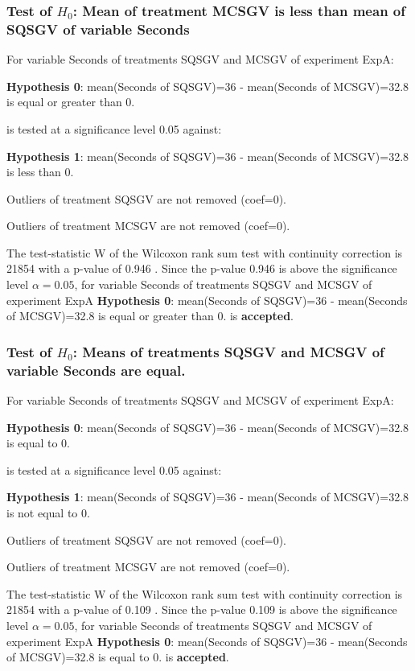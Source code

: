 \documentclass[18pt,c]{beamer}
\begin{document}
\begin{frame}[t]
 \frametitle{Test of $H_{0}$: Mean of treatment MCSGV is less than mean of SQSGV of variable Seconds }
 \scriptsize
 For variable Seconds of treatments SQSGV and MCSGV of experiment ExpA:

\vspace{1mm}
{\bf Hypothesis 0}: mean(Seconds of SQSGV)=36 - mean(Seconds of MCSGV)=32.8 is equal or greater than 0.


 \begin{center} is tested at a significance level 0.05 against: \end{center}

{\bf Hypothesis 1}: mean(Seconds of SQSGV)=36 - mean(Seconds of MCSGV)=32.8 is less than 0.
\vspace{1mm}
\vspace{1mm}

 Outliers of treatment SQSGV  are not removed (coef=0).

 Outliers of treatment MCSGV  are not removed (coef=0).
\vspace{1mm}
 
 The test-statistic W of the Wilcoxon rank sum test with continuity correction is 21854 with a p-value of 0.946 .
 Since the p-value 0.946 is above the significance level $\alpha= 0.05 $,
 for variable Seconds of treatments SQSGV and MCSGV of experiment ExpA 
 {\bf Hypothesis 0}: mean(Seconds of SQSGV)=36 - mean(Seconds of MCSGV)=32.8 is equal or greater than 0.
is {\bf accepted}.

 \end{frame}
\begin{frame}[t]
 \frametitle{Test of $H_{0}$: Means of treatments SQSGV and MCSGV of variable Seconds are equal. }
 \scriptsize
 For variable Seconds of treatments SQSGV and MCSGV of experiment ExpA:

\vspace{1mm}
{\bf Hypothesis 0}: mean(Seconds of SQSGV)=36 - mean(Seconds of MCSGV)=32.8 is equal to 0.


 \begin{center} is tested at a significance level 0.05 against: \end{center}

{\bf Hypothesis 1}: mean(Seconds of SQSGV)=36 - mean(Seconds of MCSGV)=32.8 is not equal to 0.
\vspace{1mm}
\vspace{1mm}

 Outliers of treatment SQSGV  are not removed (coef=0).

 Outliers of treatment MCSGV  are not removed (coef=0).
\vspace{1mm}
 
 The test-statistic W of the Wilcoxon rank sum test with continuity correction is 21854 with a p-value of 0.109 .
 Since the p-value 0.109 is above the significance level $\alpha= 0.05 $,
 for variable Seconds of treatments SQSGV and MCSGV of experiment ExpA 
 {\bf Hypothesis 0}: mean(Seconds of SQSGV)=36 - mean(Seconds of MCSGV)=32.8 is equal to 0.
is {\bf accepted}.

 \end{frame}
\end{document}
